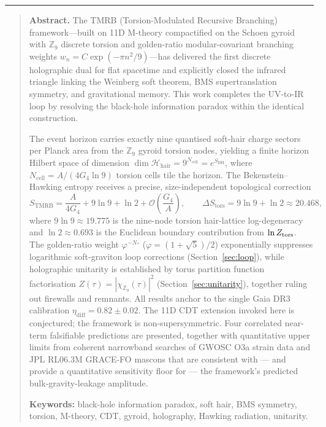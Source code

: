 \documentclass[11pt,a4paper]{article}
\renewenvironment{abstract}{%
  \begin{quote}\small\textbf{Abstract.}\quad\ignorespaces}%
  {\end{quote}}
\begin{document}
\vspace{2pt}
\begin{center}
{\color{gold}\rule{0.38\textwidth}{0.4pt}}
\end{center}
\vspace{6pt}

\begin{abstract}
The TMRB (Torsion-Modulated Recursive Branching) framework—built on 11D
M-theory compactified on the Schoen gyroid with $\mathbb{Z}_9$ discrete
torsion and golden-ratio modular-covariant branching weights
$w_n = C\exp(-\pi n^2/9)$—has delivered the first discrete holographic dual
for flat spacetime and explicitly closed the infrared triangle linking the
Weinberg soft theorem, BMS supertranslation symmetry, and gravitational memory.
This work completes the UV-to-IR loop by resolving the black-hole information
paradox within the identical construction.

The event horizon carries exactly nine quantised soft-hair charge sectors per
Planck area from the $\mathbb{Z}_9$ gyroid torsion nodes, yielding a finite
horizon Hilbert space of dimension
$\dim\mathcal{H}_{\mathrm{hair}} = 9^{N_{\mathrm{cell}}} = e^{S_{\mathrm{BH}}}$,
where $N_{\mathrm{cell}} = A/(4G_4\ln 9)$ torsion cells tile the horizon.
The Bekenstein--Hawking entropy receives a precise, size-independent topological
correction
\[
  S_{\mathrm{TMRB}} = \frac{A}{4G_4} + 9\ln 9 + \ln 2
    + \mathcal{O}\!\left(\frac{G_4}{A}\right),
  \qquad \Delta S_{\mathrm{tors}} = 9\ln 9 + \ln 2 \approx 20.468,
\]
where $9\ln 9 \approx 19.775$ is the nine-node torsion hair-lattice log-degeneracy
and $\ln 2 \approx 0.693$ is the Euclidean boundary contribution from
$\ln Z_{\rm tors}$.  The golden-ratio weight
$\varphi^{-N_*}$ ($\varphi = (1+\sqrt{5})/2$) exponentially suppresses
logarithmic soft-graviton loop corrections (Section~\ref{sec:loop}), while
holographic unitarity is established by torus partition function factorisation
$Z(\tau)=|\chi_{\mathbb{Z}_9}(\tau)|^2$ (Section~\ref{sec:unitarity}),
together ruling out firewalls and remnants.  All results anchor to the single Gaia DR3
calibration $\eta_{\mathrm{diff}} = 0.82\pm 0.02$.  The 11D CDT extension
invoked here is conjectured; the framework is non-supersymmetric.  Four
correlated near-term falsifiable predictions are presented, together with
quantitative upper limits from coherent narrowband searches of GWOSC O3a
strain data and JPL RL06.3M GRACE-FO mascons that are consistent with --- and
provide a quantitative sensitivity floor for --- the framework's predicted
bulk-gravity-leakage amplitude.

\smallskip
\noindent\textbf{Keywords:} black-hole information paradox, soft hair, BMS symmetry,
torsion, M-theory, CDT, gyroid, holography, Hawking radiation, unitarity.
\end{abstract}
\end{document}
